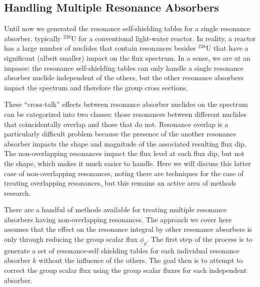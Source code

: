 \subsection{Handling Multiple Resonance Absorbers}

Until now we generated the resonance self-shielding tables for a single resonance absorber, typically $^{238}$U for a conventional light-water reactor. In reality, a reactor has a large number of nuclides that contain resonances besides $^{238}$U that have a significant (albeit smaller) impact on the flux spectrum. In a sense, we are at an impasse: the resonance self-shielding tables can only handle a single resonance absorber nuclide independent of the others, but the other resonance absorbers impact the spectrum and therefore the group cross sections.

These ``cross-talk'' effects between resonance absorber nuclides on the spectrum can be categorized into two classes: those resonances between different nuclides that coincidentally overlap and those that do not. Resonance overlap is a particularly difficult problem because the presence of the another resonance absorber impacts the shape and magnitude of the associated resulting flux dip. The non-overlapping resonances impact the flux level at each flux dip, but not the shape, which makes it much easier to handle. Here we will discuss this latter case of non-overlapping resonances, noting there are techniques for the case of treating overlapping resonances, but this remains an active area of methods research.

There are a handful of methods available for treating multiple resonance absorbers having non-overlapping resonances. The approach we cover here assumes that the effect on the resonance integral by other resonance absorbers is only through reducing the group scalar flux $\phi_g$. The first step of the process is to generate a set of resonance-self shielding tables for each individual resonance absorber $k$ without the influence of the others. The goal then is to attempt to correct the group scalar flux using the group scalar fluxes for each independent absorber.

